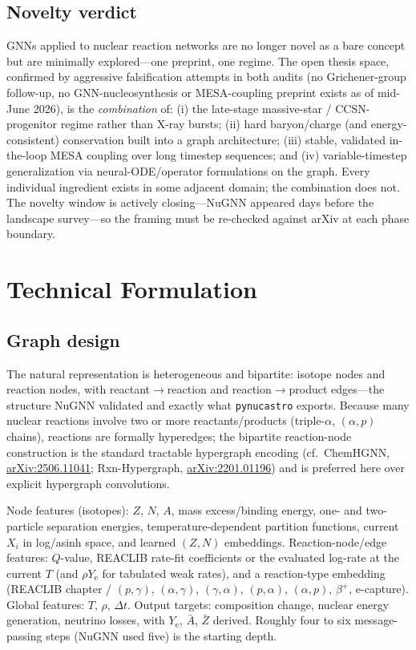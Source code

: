 \documentclass[11pt,a4paper]{article}
\newcommand{\Ye}{\ensuremath{Y_{\mathrm{e}}}}
\newcommand{\code}[1]{\texttt{#1}}
\newcommand{\arxiv}[1]{\href{https://arxiv.org/abs/#1}{arXiv:#1}}
\begin{document}
\subsection{Novelty verdict}

GNNs applied to nuclear reaction networks are no longer novel as a bare concept but are minimally explored---one preprint, one regime. The open thesis space, confirmed by aggressive falsification attempts in both audits (no Grichener-group follow-up, no GNN-nucleosynthesis or MESA-coupling preprint exists as of mid-June 2026), is the \emph{combination} of: (i) the late-stage massive-star / CCSN-progenitor regime rather than X-ray bursts; (ii) hard baryon/charge (and energy-consistent) conservation built into a graph architecture; (iii) stable, validated in-the-loop MESA coupling over long timestep sequences; and (iv) variable-timestep generalization via neural-ODE/operator formulations on the graph. Every individual ingredient exists in some adjacent domain; the combination does not. The novelty window is actively closing---NuGNN appeared days before the landscape survey---so the framing must be re-checked against arXiv at each phase boundary.

\section{Technical Formulation}

\subsection{Graph design}

The natural representation is heterogeneous and bipartite: isotope nodes and reaction nodes, with reactant$\to$reaction and reaction$\to$product edges---the structure NuGNN validated and exactly what \code{pynucastro} exports. Because many nuclear reactions involve two or more reactants/products (triple-$\alpha$, $(\alpha,p)$ chains), reactions are formally hyperedges; the bipartite reaction-node construction is the standard tractable hypergraph encoding (cf.\ ChemHGNN, \arxiv{2506.11041}; Rxn-Hypergraph, \arxiv{2201.01196}) and is preferred here over explicit hypergraph convolutions.

Node features (isotopes): $Z$, $N$, $A$, mass excess/binding energy, one- and two-particle separation energies, temperature-dependent partition functions, current $X_i$ in log/asinh space, and learned $(Z,N)$ embeddings. Reaction-node/edge features: $Q$-value, REACLIB rate-fit coefficients or the evaluated log-rate at the current $T$ (and $\rho\Ye$ for tabulated weak rates), and a reaction-type embedding (REACLIB chapter / $(p,\gamma)$, $(\alpha,\gamma)$, $(\gamma,\alpha)$, $(p,\alpha)$, $(\alpha,p)$, $\beta^{+}$, e-capture). Global features: $T$, $\rho$, $\Delta t$. Output targets: composition change, nuclear energy generation, neutrino losses, with \Ye, $\bar{A}$, $\bar{Z}$ derived. Roughly four to six message-passing steps (NuGNN used five) is the starting depth.
\end{document}
